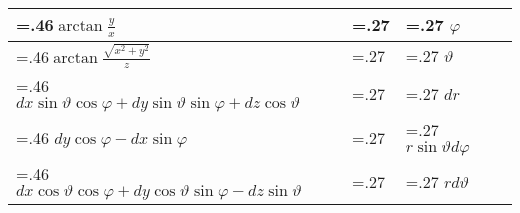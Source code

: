 \begin{tabularx}{0.45\textwidth}{>{\hsize=.46\hsize}X|>{\hsize=.27\hsize}X|>{\hsize=.27\hsize}X}
    \hline
    $\arctan \frac{y}{x}$                                                                &                  & $\varphi$                       \\
    \hline
    $\arctan \frac{\sqrt{x^{2}+y^{2}}}{z}$                                               &                  & $\vartheta$                     \\
    \hline
    $d x \sin \vartheta \cos \varphi+d y \sin \vartheta \sin \varphi+d z \cos \vartheta$ &                  & $dr$                            \\
    \hline
    $d y \cos \varphi-d x \sin \varphi$                                                  &                  & $r \sin \vartheta d \varphi$    \\
    \hline
    $d x \cos \vartheta \cos \varphi+d y \cos \vartheta \sin \varphi-d z \sin \vartheta$ &                  & $r d \vartheta$                 \\
\end{tabularx}